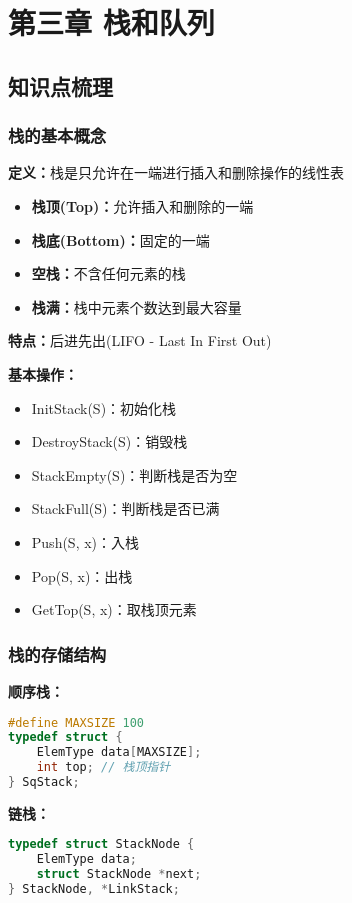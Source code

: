 \documentclass[12pt,a4paper]{amsart}
\begin{document}
\section{第三章 栈和队列}

\subsection{知识点梳理}

\subsubsection{栈的基本概念}
\textbf{定义：}栈是只允许在一端进行插入和删除操作的线性表
\begin{itemize}
\item \textbf{栈顶(Top)：}允许插入和删除的一端
\item \textbf{栈底(Bottom)：}固定的一端
\item \textbf{空栈：}不含任何元素的栈
\item \textbf{栈满：}栈中元素个数达到最大容量
\end{itemize}

\textbf{特点：}后进先出(LIFO - Last In First Out)

\textbf{基本操作：}
\begin{itemize}
\item InitStack(S)：初始化栈
\item DestroyStack(S)：销毁栈
\item StackEmpty(S)：判断栈是否为空
\item StackFull(S)：判断栈是否已满
\item Push(S, x)：入栈
\item Pop(S, x)：出栈
\item GetTop(S, x)：取栈顶元素
\end{itemize}

\subsubsection{栈的存储结构}

\textbf{顺序栈：}
\begin{lstlisting}[language=C++]
#define MAXSIZE 100
typedef struct {
    ElemType data[MAXSIZE];
    int top; // 栈顶指针
} SqStack;
\end{lstlisting}

\textbf{链栈：}
\begin{lstlisting}[language=C++]
typedef struct StackNode {
    ElemType data;
    struct StackNode *next;
} StackNode, *LinkStack;
\end{lstlisting}
\end{document}
